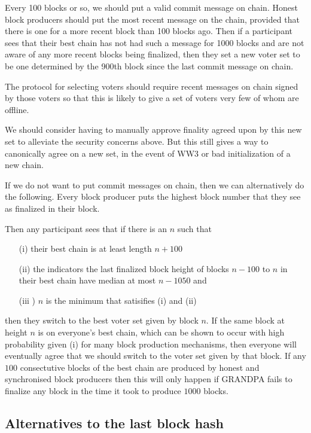 \documentclass[a4paper,UKenglish,cleveref, autoref, thm-restate, anonymous]{lipics-v2019}
\begin{document}
{Every 100 blocks or so, we should put a valid commit message on chain. Honest block producers should put the most recent message on the chain, provided that there is one for a more recent block than 100 blocks ago.
Then if a participant sees that their best chain has not had such a message for 1000 blocks and are not aware of any more recent blocks being finalized, then they set a new voter set to be one determined by the 900th block since the last commit message on chain. 

The protocol for selecting voters should require recent messages on chain signed by those voters so that this is likely to give a set of voters very few of whom are offline.

We should consider having to manually approve finality agreed upon by this new set to alleviate the security concerns above. But this still gives a way to canonically agree on a new set, in the event of WW3 or bad initialization of a new chain.

If we do not want to put commit messages on chain, then we can alternatively do the following. Every block producer puts the highest block number that they see as finalized in their block.

Then any participant sees that if there is an $n$ such that
\begin{itemize}
\item[(i)] their best chain is at least length $n+100$
\item[(ii)] the indicators the last finalized block height of blocks $n-100$ to $n$ in their best chain have median at most $n-1050$ and
\item[(iii]) $n$ is the minimum that satisifies (i) and (ii)
\end{itemize}
then they switch to the best voter set given by block $n$. If the same block at height $n$ is on everyone's best chain, which can be shown to occur with high probability given (i) for many block production mechanisms, then everyone will eventually agree that we should switch to the voter set given by that block. If any $100$ consectutive blocks of the best chain are produced by honest and synchronised block producers then this will only happen if GRANDPA fails to finalize any block in the time it took to produce $1000$ blocks.

\subsection{Alternatives to the last block hash}

}
\end{document}
